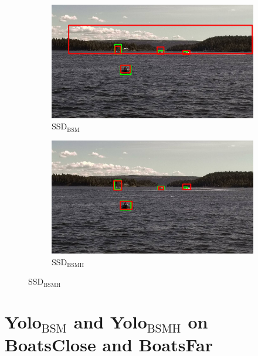 \begin{figure}
\begin{subfigure}{.5\textwidth}
  \centering
  \includegraphics[width=0.9\linewidth]{results/case_buildings/bigbox_bcbf/SSD2/selected_08_14_frame1150.jpg}
  \caption{SSD$_{\text{BSM}}$}
  \label{fig:sfig1}
\end{subfigure}%
\begin{subfigure}{.5\textwidth}
  \centering
  \includegraphics[width=.9\linewidth]{results/case_buildings/bigbox_bcbf/SSD3/selected_08_14_frame1150.jpg}
  \caption{SSD$_{\text{BSMH}}$}
  \label{fig:sfig2}
\end{subfigure}


\end{figure}

\newpage

\section{Yolo$_{\text{BSM}}$ and Yolo$_{\text{BSMH}}$ on BoatsClose and BoatsFar}
\label{sec:yolo23_bcbf}

